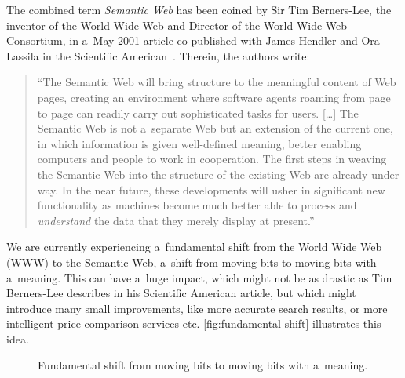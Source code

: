 The combined term \emph{Semantic Web} has been coined by Sir Tim Berners-Lee,
the inventor of the World Wide Web and Director of the World Wide Web Consortium,
in a~May 2001 article co-published with James Hendler and Ora Lassila
in the Scientific American~\cite{BernersLee2001}.
Therein, the authors write: 

\begin{quotation}
``The Semantic Web will bring structure to the meaningful content of Web pages,
creating an environment where software agents roaming from page to page
can readily carry out sophisticated tasks for users. [\ldots]
The Semantic Web is not a~separate Web but an extension of the current one,
in which information is given well-defined meaning, better enabling computers and people
to work in cooperation.
The first steps in weaving the Semantic Web into the structure of the existing Web
are already under way.
In the near future, these developments will usher in significant new functionality
as machines become much better able to process and \emph{understand} the data
that they merely display at present.''
\end{quotation}

We are currently experiencing a~fundamental shift from the World Wide Web (WWW) to the Semantic Web,
a~shift from moving bits to moving bits with a~meaning.
This can have a~huge impact, which might not be as drastic as Tim Berners-Lee describes
in his Scientific American article, but which might introduce many small improvements,
like more accurate search results, or more intelligent price comparison services etc.
\autoref{fig:fundamental-shift} illustrates this idea.

\begin{figure}[htbp!]
\begin{center}
  \caption{Fundamental shift from moving bits to moving bits with a~meaning.}
  \label{fig:fundamental-shift}  
\end{center}    
\end{figure}

